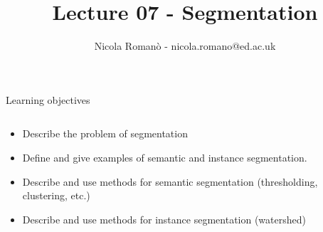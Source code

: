 \documentclass[9pt, aspectratio=169]{beamer}
\author{Nicola Roman\`o - nicola.romano@ed.ac.uk}
\title{Lecture 07 - Segmentation}
\date{}
\begin{document}

\begin{frame}
    \titlepage
\end{frame}

\begin{frame}
    {Learning objectives}
    \begin{columns}
        \begin{column}{0.8\textwidth}
            \begin{itemize}
                \item Describe the problem of segmentation
                \item Define and give examples of semantic and instance segmentation.
                \item Describe and use methods for semantic segmentation (thresholding, clustering, etc.)
                \item Describe and use methods for instance segmentation (watershed)
            \end{itemize}
        \end{column}
        \begin{column}{0.2\textwidth}

\end{column}
\end{columns}
\end{frame}
\end{document}
